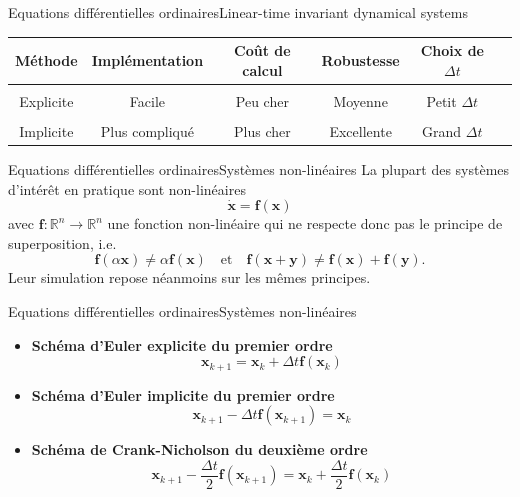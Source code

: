\documentclass[usenames,dvipsnames,svgnames,10pt,aspectratio=169]{beamer}
\begin{document}
\begin{frame}[t, c]{Equations différentielles ordinaires}{Linear-time invariant dynamical systems}
  \centering
  \begin{tabular}{c|ccccc}
    Méthode & Implémentation & Coût de calcul & Robustesse & Choix de $\Delta t$ \\
    \hline
    \hline \\
    Explicite & {\color{green}Facile} & {\color{green} Peu cher} & {\color{red} Moyenne} & {\color{orange} Petit $\Delta t$}
    \\
    \\
    Implicite & {\color{orange} Plus compliqué} & {\color{orange} Plus cher} & {\color{green} Excellente} & {\color{green} Grand $\Delta t$}
  \end{tabular}
\end{frame}

\begin{frame}[t, c]{Equations différentielles ordinaires}{Systèmes non-linéaires}
  La plupart des systèmes d'intérêt en pratique sont non-linéaires
  \[
  \dot{\bm{x}} = \bm{f}(\bm{x})
  \]
  avec $\bm{f} : \mathbb{R}^n \to \mathbb{R}^n$ une fonction non-linéaire qui ne respecte donc pas le principe de superposition, i.e.
  \[
  \bm{f}(\alpha \bm{x}) \neq \alpha \bm{f}(\bm{x}) \quad \text{et} \quad \bm{f}(\bm{x} + \bm{y}) \neq \bm{f}(\bm{x}) + \bm{f}(\bm{y}).
  \]
  Leur simulation repose néanmoins sur les mêmes principes.
\end{frame}

\begin{frame}[t, c]{Equations différentielles ordinaires}{Systèmes non-linéaires}
  \begin{itemize}
  \item \alert{\textbf{Schéma d'Euler explicite du premier ordre}}
    \[
    \bm{x}_{k+1} = \bm{x}_k + \Delta t \bm{f}(\bm{x}_k)
    \]
    
  \item \alert{\textbf{Schéma d'Euler implicite du premier ordre}}
    \[
    \bm{x}_{k+1} - \Delta t \bm{f}(\bm{x}_{k+1}) = \bm{x}_k
    \]
    
  \item \alert{\textbf{Schéma de Crank-Nicholson du deuxième ordre}}
    \[
    \bm{x}_{k+1} - \dfrac{\Delta t}{2} \bm{f}(\bm{x}_{k+1}) = \bm{x}_k + \dfrac{\Delta t}{2} \bm{f}(\bm{x}_k)
    \]
  \end{itemize}
\end{frame}
\end{document}
